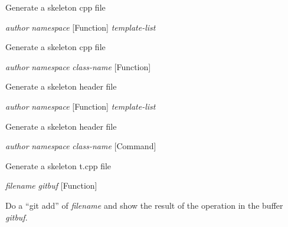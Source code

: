 \begin{doc-string}
Generate a skeleton cpp file
\end{doc-string}

\vspace{1em}
\noindent
{}
\usebox{\funcname}\emph{author} \emph{namespace}
 \hfill [Function]
\hspace*{\wd\funcname}\emph{template-list}

\begin{doc-string}
Generate a skeleton cpp file
\end{doc-string}

\vspace{1em}
\noindent
{}
\usebox{\funcname}\emph{author} \emph{namespace} \emph{class-name}
 \hfill [Function]

\begin{doc-string}
Generate a skeleton header file
\end{doc-string}

\vspace{1em}
\noindent
{}
\usebox{\funcname}\emph{author} \emph{namespace}
 \hfill [Function]
\hspace*{\wd\funcname}\emph{template-list}

\begin{doc-string}
Generate a skeleton header file
\end{doc-string}

\vspace{1em}
\noindent
{}
\usebox{\funcname}\emph{author} \emph{namespace} \emph{class-name}
 \hfill [Command]

\begin{doc-string}
Generate a skeleton t.cpp file
\end{doc-string}

\vspace{1em}
\noindent
{}
\usebox{\funcname}\emph{filename} \emph{gitbuf}
 \hfill [Function]

\begin{doc-string}
Do a ``git add'' of \emph{filename} and show the result of the operation in
the buffer \emph{gitbuf}.
\end{doc-string}

